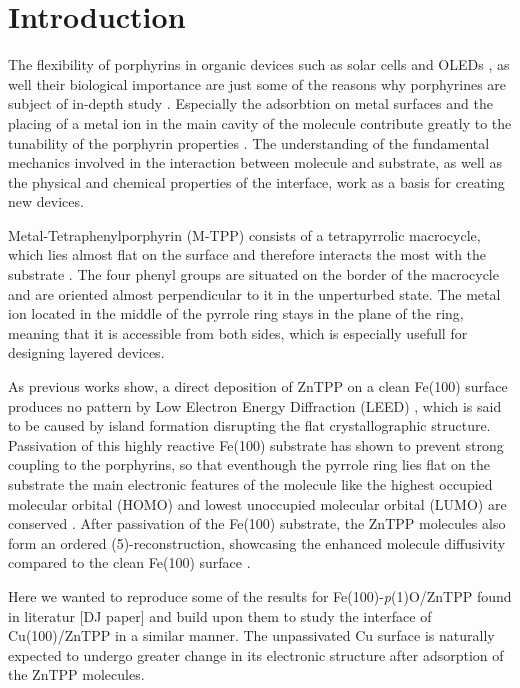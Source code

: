 \chapter{Introduction}
The flexibility of porphyrins in organic devices such as solar cells \cite*{schmidt-mende_zn-porphyrin-sensitized_2005} and OLEDs \cite*{graham_extended_2011}, as well their biological importance \cite*{dolphin_biochemical_1974} are just some of the reasons why porphyrines are subject of in-depth study \cite*{gottfried_surface_2015}.
Especially the adsorbtion on metal surfaces and the placing of a metal ion in the main cavity of the molecule contribute greatly to the tunability of the porphyrin properties \cite*{calloni_electron_2014}.
The understanding of the fundamental mechanics involved in the interaction between molecule and substrate, as well as the physical and chemical properties of the interface, work as a basis for creating new devices.

Metal-Tetraphenylporphyrin (M-TPP) consists of a tetrapyrrolic macrocycle, which lies almost flat on the surface and therefore interacts the most with the substrate \cite*{picone_local_2018}.
The four phenyl groups are situated on the border of the macrocycle and are oriented almost perpendicular to it in the unperturbed state.
The metal ion located in the middle of the pyrrole ring stays in the plane of the ring, meaning that it is accessible from both sides, which is especially usefull for designing layered devices.

As previous works show, a direct deposition of ZnTPP on a clean Fe(100) surface produces no pattern by Low Electron Energy Diffraction (LEED) \cite*{bussetti_structure_2016}, which is said to be caused by island formation disrupting the flat crystallographic structure.
Passivation of this highly reactive Fe(100) substrate has shown to prevent strong coupling to the porphyrins, so that eventhough the pyrrole ring lies flat on the substrate the main electronic features of the molecule like the highest occupied molecular orbital (HOMO) and lowest unoccupied molecular orbital (LUMO) are conserved \cite*{picone_local_2018}.
After passivation of the Fe(100) substrate, the ZnTPP molecules also form an ordered (5)-reconstruction, showcasing the enhanced molecule diffusivity compared to the clean Fe(100) surface \cite*{bussetti_structure_2016}.

Here we wanted to reproduce some of the results for Fe(100)-\textit{p}(1)O/ZnTPP found in literatur \cite*{bussetti_filled_2016} [DJ paper] and build upon them to study the interface of Cu(100)/ZnTPP in a similar manner.
The unpassivated Cu surface is naturally expected to undergo greater change in its electronic structure after adsorption of the ZnTPP molecules.